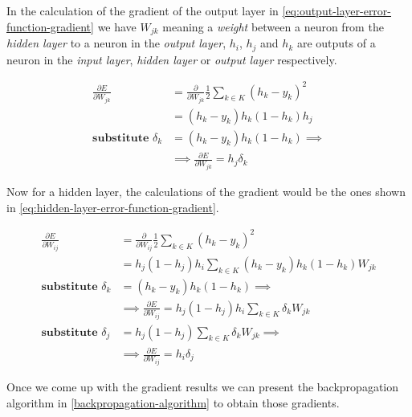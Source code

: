 In the calculation of the gradient of the output layer in
\autoref{eq:output-layer-error-function-gradient} we have $W_{jk}$
meaning a \textit{weight} between a neuron from the \textit{hidden
layer} to a neuron in the \textit{output layer}, $h_i$, $h_j$ and
$h_k$ are outputs of a neuron in the \textit{input layer},
\textit{hidden layer} or \textit{output layer} respectively.

\begin{equation}
  \begin{aligned}
    \label{eq:output-layer-error-function-gradient}
    \frac{\partial E}{\partial W_{jk}} & = \frac{\partial}{\partial
      W_{jk}} \frac{1}{2} \sum_{k \in K} (h_k - y_k)^2 \\
    & = (h_k - y_k)h_k(1-h_k)h_j \\
    \textbf{substitute } \delta_k & = (h_k - y_k)h_k(1-h_k) \implies \\
    & \implies \frac{\partial E}{\partial W_{jk}} = h_j \delta_k
  \end{aligned}
\end{equation}

Now for a hidden layer, the calculations of the gradient would be the
ones shown in \autoref{eq:hidden-layer-error-function-gradient}.

\begin{equation}
  \begin{aligned}
    \label{eq:hidden-layer-error-function-gradient}
    \frac{\partial E}{\partial W_{ij}} & = \frac{\partial}{\partial
      W_{ij}} \frac{1}{2} \sum_{k \in K} (h_k - y_k)^2 \\
    & = h_j(1-h_j)h_i \sum_{k \in K} (h_k - y_k) h_k(1 - h_k) W_{jk}  \\
    \textbf{substitute } \delta_k & = (h_k - y_k) h_k(1 - h_k) \implies \\
    & \implies \frac{\partial E}{\partial W_{ij}} = h_j(1-h_j)h_i
    \sum_{k \in K} \delta_k W_{jk} \\
    \textbf{substitute } \delta_j & = h_j(1-h_j) \sum_{k \in K} \delta_k
    W_{jk}  \implies \\ 
    & \implies \frac{\partial E}{\partial W_{ij}} = h_i\delta_j
  \end{aligned}
\end{equation}

Once we come up with the gradient results we can present the
backpropagation algorithm in \autoref{backpropagation-algorithm} to
obtain those gradients.

